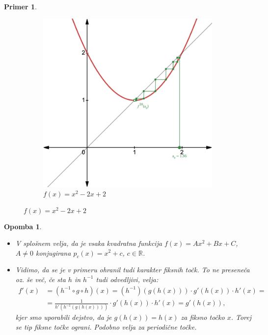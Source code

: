 \documentclass{article}
\newtheorem{opomba}{Opomba}
\newtheorem{primer}{Primer}
\newcommand{\R}{\mathbb{R}}
\begin{document}
\begin{primer}
\begin{center}
\begin{figure}[h]
\begin{subfigure}{0.45\textwidth}
            \includegraphics[width=\textwidth]{Grafi/cobweb12.png}
            \caption{$f(x) = x^2 - 2x + 2$}
        \end{subfigure}
    \end{figure}
    
\end{center}
\end{primer}

\begin{opomba}
    \hfill
\begin{itemize}
\item V splošnem velja, da je vsaka kvadratna funkcija $f(x) = Ax^2+ Bx + C$, $A \neq 0$ konjugirana $p_c(x) = x^2 + c$, $c\in \R$.
\item Vidimo, da se je v primeru ohranil tudi karakter fiksnih točk. To ne preseneča oz. še več, če sta $h$ in $h^{-1}$ tudi odvedljivi, velja:
\begin{align*}
f'(x) &= (h^{-1} \circ g \circ h)(x) = (h^{-1}) (g(h(x))) \cdot g'(h(x)) \cdot h'(x) = \\ 
&= \frac{1}{h'(h^{-1} (g(h(x))))} \cdot g'(h(x))\cdot h'(x) = g'(h(x)),
\end{align*}
kjer smo uporabili dejstvo, da je $g(h(x)) = h(x)$ za fiksno točko $x$.
Torej se tip fiksne točke ograni. Podobno velja za periodične točke.
\end{itemize}
\end{opomba}
\end{document}
